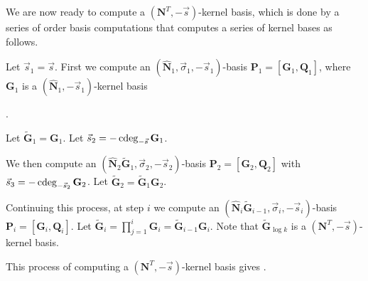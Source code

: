 We are now ready to compute a $\left(\mathbf{N}^{T},-\vec{s}\right)$-kernel
basis, which is done by a series of order basis computations that
computes a series of kernel bases as follows.

Let $\vec{s}_{1}=\vec{s}$. First we compute an $\left(\hat{\mathbf{N}}_{1},\vec{\sigma}_{1},-\vec{s}_{1}\right)$-basis
$\mathbf{P}_{1}=\left[\mathbf{G}_{1},\mathbf{Q}_{1}\right]$, where
$\mathbf{G}_{1}$ is a $\left(\hat{\mathbf{N}}_{1},-\vec{s}_{1}\right)$-kernel
basis%
\begin{comment}
 with $\cdeg_{-\vec{s}_{1}}\mathbf{N}_{1}\le0$
\end{comment}
.

Let $\tilde{\mathbf{G}}_{1}=\mathbf{G}_{1}$. Let $\vec{s}_{2}=-\cdeg_{-\vec{s}}\mathbf{G}_{1}$.
\begin{comment}
Note that $-\vec{s}_{1}\le-[\vec{s}_{2},\vec{t}_{2}]\le\left[0,\dots,0,1,\dots1\right]$
component-wise, since $\mathbf{P}_{1}$ has lower order than any $\left(\mathbf{M}^{T},\vec{b}+\left[1,\dots,1\right],-\vec{s}\right)$-basis
$\mathbf{P}$ hence generates $\mathbf{P}$. Therefore, $\cdeg_{-\vec{s}}\mathbf{P}_{1}\le\cdeg_{-\vec{s}}\mathbf{P}\le\left[0,\dots,0,1,\dots1\right]$. 
\end{comment}
{} We then compute an $\left(\hat{\mathbf{N}}_{2}\tilde{\mathbf{G}}_{1},\vec{\sigma}_{2},-\vec{s}_{2}\right)$-basis
$\mathbf{P}_{2}=\left[\mathbf{G}_{2},\mathbf{Q}_{2}\right]$ with
$\vec{s}_{3}=-\cdeg_{-\vec{s}_{2}}\mathbf{G}_{2}$. Let $\tilde{\mathbf{G}}_{2}=\tilde{\mathbf{G}}_{1}\mathbf{G}_{2}$.
\begin{comment}
Let $\mathbf{R}_{1}=\left[\mathbf{N}_{1}\mathbf{Q}_{2},\mathbf{Q}_{1}\right]$
and $\mathbf{R}_{1}^{r}=\revCol\left(\mathbf{R}_{1},-\vec{s},\cdeg_{-\vec{s}}\mathbf{R}_{1}\right)$.
Then from \prettyref{lem:unimodularComputationByRows} we know $\left[\mathbf{F}^{T},\mathbf{R}_{1}^{r}\right]$
is a unimodular matrix.
\end{comment}


Continuing this process, at step $i$ we compute an $\left(\hat{\mathbf{N}}_{i}\tilde{\mathbf{G}}_{i-1},\vec{\sigma}_{i},-\vec{s}_{i}\right)$-basis
$\mathbf{P}_{i}=\left[\mathbf{G}_{i},\mathbf{Q}_{i}\right]$. Let
$\tilde{\mathbf{G}}_{i}=\prod_{j=1}^{i}\mathbf{G}_{i}=\tilde{\mathbf{G}}_{i-1}\mathbf{G}_{i}$.
Note that $\tilde{\mathbf{G}}_{\log k}$ is a $\left(\mathbf{N}^{T},-\vec{s}\right)$-kernel
basis. 

This process of computing a $\left(\mathbf{N}^{T},-\vec{s}\right)$-kernel
basis gives .

